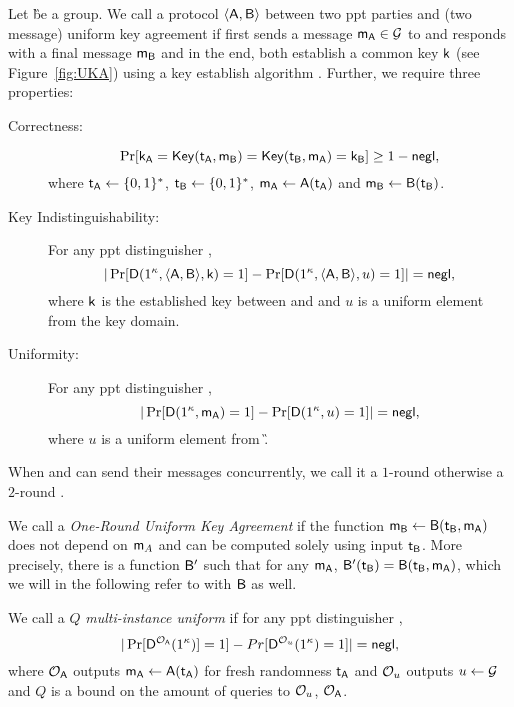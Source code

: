 \begin{definition} 
Let \G be a group.
We call a protocol $\langle \mathsf{A},\mathsf{B}\rangle$ between two ppt parties \A and \B (two message) uniform key agreement if \A first sends a message $\mathsf{m}_\mathsf{A}\in\mathcal{G}$ to \B and \B responds with a final message $\mathsf{m}_\mathsf{B}$ and in the end, both establish a common key $\mathsf{k}$ (see Figure~\ref{fig:UKA}) using a key establish algorithm \EK. Further, we require three properties:
\begin{description}
\item[Correctness:]
$$
\Pr[\mathsf{k}_\mathsf{A}=\mathsf{Key}(\mathsf{t}_\mathsf{A},\mathsf{m}_\mathsf{B})=\mathsf{Key}(\mathsf{t}_\mathsf{B},\mathsf{m}_\mathsf{A})=\mathsf{k}_\mathsf{B}]\geq 1-\mathsf{negl},
$$
where $\mathsf{t}_\mathsf{A}\leftarrow\{0,1\}^*$, $\mathsf{t}_\mathsf{B}\leftarrow\{0,1\}^*$, $\mathsf{m}_\mathsf{A}\leftarrow\mathsf{A}(\mathsf{t}_\mathsf{A})$ and $\mathsf{m}_\mathsf{B}\leftarrow\mathsf{B}(\mathsf{t}_\mathsf{B})$.
\item [Key Indistinguishability:] For any ppt distinguisher \D,
$$ 
|\Pr[\mathsf D(1^\kappa,\langle \mathsf{A},\mathsf{B}\rangle, \mathsf{k})=1]-\Pr[\mathsf D(1^\kappa,\langle \mathsf{A},\mathsf{B}\rangle, u)=1]|=\mathsf{negl},
$$
where $\mathsf{k}$ is the established key between \A and \B and $u$ is a uniform element from the key domain.
\item [Uniformity:] For any ppt distinguisher \D, 
$$
|\Pr[\mathsf D(1^\kappa,\mathsf{m}_\mathsf{A})=1]-\Pr[\mathsf D( 1^\kappa,u)=1]|=\mathsf{negl},
$$
where $u$ is a uniform element from \G.
\end{description}
When \A and \B can send their messages concurrently, we call it a $1$-round \UKA otherwise a $2$-round \UKA.
\end{definition}

\begin{definition}
We call a \UKA \emph{One-Round Uniform Key Agreement} if the function $\mathsf{m}_{\mathsf{B}}\leftarrow\mathsf{B}(\mathsf{t}_{\mathsf{B}},\mathsf{m}_\mathsf{A})$ does not depend on $\mathsf{m}_A$ and can be computed solely using input $\mathsf{t}_{\mathsf{B}}$. More precisely, there is a function $\mathsf{B}'$ such that for any $\mathsf{m}_{\mathsf{A}}$, $\mathsf{B}'(\mathsf{t}_{\mathsf{B}})=\mathsf{B}(\mathsf{t}_{\mathsf{B}},\mathsf{m}_{\mathsf{A}})$, which we will in the following refer to with $\mathsf{B}$ as well. 
\end{definition}

\begin{definition}
We call a \UKA $Q$ \emph{multi-instance uniform} if for any ppt distinguisher \D,
$$
|\Pr[\mathsf D^{\mathcal{O}_{\mathsf{A}}}(1^{\kappa})]=1]-Pr[\mathsf D^{\mathcal{O}_{u}}(1^{\kappa})=1]|=\mathsf{negl},
$$
where $\mathcal{O}_{\mathsf{A}}$ outputs $\mathsf{m}_\mathsf{A}\leftarrow\mathsf{A}(\mathsf{t}_\mathsf{A})$ for fresh randomness $\mathsf{t}_\mathsf{A}$ and $\mathcal{O}_u$ outputs $u\leftarrow\mathcal{G}$ and $Q$ is a bound on the amount of queries to $\mathcal{O}_{u}$, $\mathcal{O}_{\mathsf{A}}$.
\end{definition}



